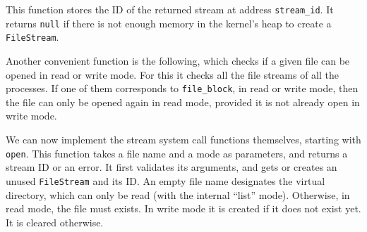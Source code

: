 This function stores the ID of the returned stream at address {\tt stream\_id}.
It returns {\tt null} if there is not enough memory in the kernel's heap to
create a {\tt FileStream}.


Another convenient function is the following, which checks if a given file can
be opened in read or write mode. For this it checks all the file streams of all
the processes. If one of them corresponds to {\tt file\_block}, in read or
write mode, then the file can only be opened again in read mode, provided it is
not already open in write mode.


We can now implement the stream system call functions themselves, starting with
{\tt open}. This function takes a file name and a mode as parameters, and
returns a stream ID or an error. It first validates its arguments, and gets or
creates an unused {\tt FileStream} and its ID. An empty file name designates
the virtual directory, which can only be read (with the internal ``list''
mode). Otherwise, in read mode, the file must exists. In write mode it is
created if it does not exist yet. It is cleared otherwise.

